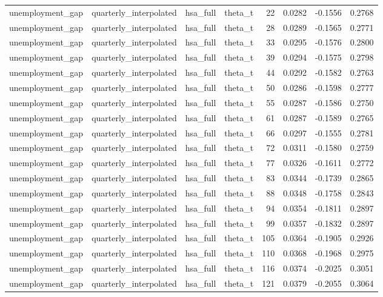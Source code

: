 \begin{tabular}{llllrrrr}
unemployment\_gap & quarterly\_interpolated & hsa\_full & theta\_t & 22 & 0.0282 & -0.1556 & 0.2768 \\
unemployment\_gap & quarterly\_interpolated & hsa\_full & theta\_t & 28 & 0.0289 & -0.1565 & 0.2771 \\
unemployment\_gap & quarterly\_interpolated & hsa\_full & theta\_t & 33 & 0.0295 & -0.1576 & 0.2800 \\
unemployment\_gap & quarterly\_interpolated & hsa\_full & theta\_t & 39 & 0.0294 & -0.1575 & 0.2798 \\
unemployment\_gap & quarterly\_interpolated & hsa\_full & theta\_t & 44 & 0.0292 & -0.1582 & 0.2763 \\
unemployment\_gap & quarterly\_interpolated & hsa\_full & theta\_t & 50 & 0.0286 & -0.1598 & 0.2777 \\
unemployment\_gap & quarterly\_interpolated & hsa\_full & theta\_t & 55 & 0.0287 & -0.1586 & 0.2750 \\
unemployment\_gap & quarterly\_interpolated & hsa\_full & theta\_t & 61 & 0.0287 & -0.1589 & 0.2765 \\
unemployment\_gap & quarterly\_interpolated & hsa\_full & theta\_t & 66 & 0.0297 & -0.1555 & 0.2781 \\
unemployment\_gap & quarterly\_interpolated & hsa\_full & theta\_t & 72 & 0.0311 & -0.1580 & 0.2759 \\
unemployment\_gap & quarterly\_interpolated & hsa\_full & theta\_t & 77 & 0.0326 & -0.1611 & 0.2772 \\
unemployment\_gap & quarterly\_interpolated & hsa\_full & theta\_t & 83 & 0.0344 & -0.1739 & 0.2865 \\
unemployment\_gap & quarterly\_interpolated & hsa\_full & theta\_t & 88 & 0.0348 & -0.1758 & 0.2843 \\
unemployment\_gap & quarterly\_interpolated & hsa\_full & theta\_t & 94 & 0.0354 & -0.1811 & 0.2897 \\
unemployment\_gap & quarterly\_interpolated & hsa\_full & theta\_t & 99 & 0.0357 & -0.1832 & 0.2897 \\
unemployment\_gap & quarterly\_interpolated & hsa\_full & theta\_t & 105 & 0.0364 & -0.1905 & 0.2926 \\
unemployment\_gap & quarterly\_interpolated & hsa\_full & theta\_t & 110 & 0.0368 & -0.1968 & 0.2975 \\
unemployment\_gap & quarterly\_interpolated & hsa\_full & theta\_t & 116 & 0.0374 & -0.2025 & 0.3051 \\
unemployment\_gap & quarterly\_interpolated & hsa\_full & theta\_t & 121 & 0.0379 & -0.2055 & 0.3064 \\

\end{tabular}
